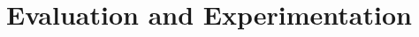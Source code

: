 

\chapter{Evaluation and Experimentation}
\label{cha:evaluation_and_experimentation}

\graphicspath{{Chapter5-Evaluation/Figs/}}


